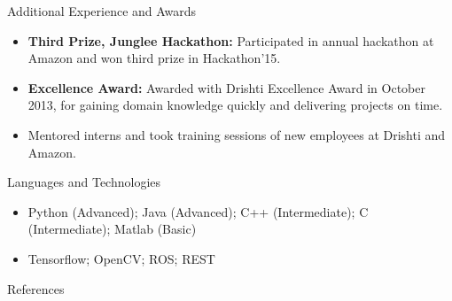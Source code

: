 \documentclass[]{mcdowellcv}
\begin{document}
	\begin{cvsection}{Additional Experience and Awards}
		\begin{cvsubsection}{}{}{}	
			\begin{itemize}
				\item \textbf{Third Prize, Junglee Hackathon:} Participated in annual hackathon at Amazon and won third prize in Hackathon’15.
				\item \textbf{Excellence Award:} Awarded with Drishti Excellence Award in October 2013, for gaining domain knowledge quickly and delivering projects on time.
				\item Mentored interns and took training sessions of new employees at Drishti and Amazon.
			\end{itemize}
		\end{cvsubsection}
	\end{cvsection}
	
	\begin{cvsection}{Languages and Technologies}
		\begin{cvsubsection}{}{}{}	
			\begin{itemize}
				\item Python (Advanced); Java (Advanced); C++ (Intermediate); C (Intermediate); Matlab (Basic)
				\item Tensorflow; OpenCV; ROS; REST
			\end{itemize}
		\end{cvsubsection}
	\end{cvsection}
	
		\begin{cvsection}{References}

     	\printbibliography[heading=none]

	\end{cvsection}
	
\end{document}
